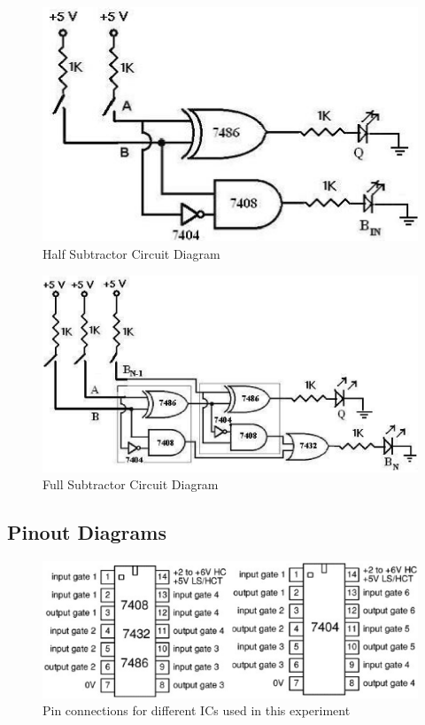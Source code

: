 \begin{figure}[H]
    \centering
    \includegraphics[width=0.7\columnwidth]{images/c-half-sub.png}
    \caption{Half Subtractor Circuit Diagram}
    \label{half-subt}
\end{figure}

\begin{figure}[H]
    \centering
    \includegraphics[width=0.85\columnwidth]{images/c-full-sub.png}
    \caption{Full Subtractor Circuit Diagram}
    \label{full-subt}
\end{figure}

\subsection*{Pinout Diagrams}
\begin{figure}[H]
    \centering
    \includegraphics[width=0.9\columnwidth]{images/pinout.png}
    \caption{Pin connections for different ICs used in this experiment}
    \label{pinout}
\end{figure}